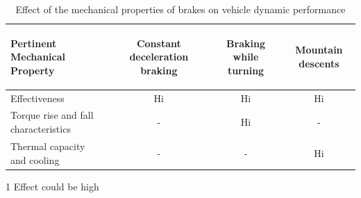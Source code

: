 \begin{table}[H]
	\centering\footnotesize
	\begin{threeparttable}
	
        \begin{tabulary}{\textwidth}{lccc}
            \toprule
            \textbf{Pertinent Mechanical Property} & \begin{sideways}\textbf{Constant deceleration braking}\end{sideways} & \begin{sideways}\textbf{Braking while turning}\end{sideways} & \begin{sideways}\textbf{Mountain descents}\end{sideways} \\\midrule
            Effectiveness & Hi    & Hi    & Hi \\
            Torque rise and fall characteristics & -     & Hi    & - \\
            Thermal capacity and cooling & -     & -     & Hi\\
            \bottomrule
		\end{tabulary}

		\caption{Effect of the mechanical properties of brakes on vehicle dynamic performance \cite{Fancher1986}}
        \label{table:effect-of-the-mechanical-properties-of-brakes-on-vehicle-dynamic-performance}
        
        \begin{tablenotes}
            \item[1] Effect could be high
        \end{tablenotes}

	\end{threeparttable}
\end{table}

